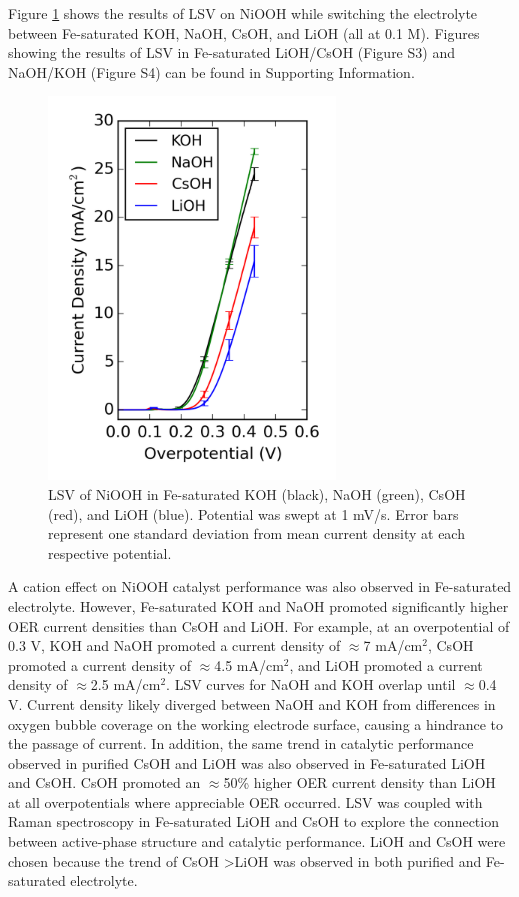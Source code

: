 \documentclass[journal=jpccck,manuscript=article,email=true]{achemso}
\begin{document}
Figure \ref{fig-2} shows the results of LSV on NiOOH while switching the electrolyte between Fe-saturated KOH, NaOH, CsOH, and LiOH (all at 0.1 M). Figures showing the results of LSV in Fe-saturated LiOH/CsOH (Figure S3) and NaOH/KOH (Figure S4) can be found in Supporting Information.

\begin{figure}[h]
\centering
\includegraphics[width=3in]{./images/figures-main/IvsV-Na-K-Li-Cs-iron.png}
\caption{\label{fig-2}LSV of NiOOH in Fe-saturated KOH (black), NaOH (green), CsOH (red), and LiOH (blue). Potential was swept at 1 mV/s. Error bars represent one standard deviation from mean current density at each respective potential.}
\end{figure}

A cation effect on NiOOH catalyst performance was also observed in Fe-saturated electrolyte. However, Fe-saturated KOH and NaOH promoted significantly higher OER current densities than CsOH and LiOH. For example, at an overpotential of 0.3 V, KOH and NaOH promoted a current density of $\approx$7 mA/cm$^{\text{2}}$, CsOH promoted a current density of $\approx$4.5 mA/cm$^{\text{2}}$, and LiOH promoted a current density of $\approx$2.5 mA/cm$^{\text{2}}$. LSV curves for NaOH and KOH overlap until $\approx$0.4 V. Current density likely diverged between NaOH and KOH from differences in oxygen bubble coverage on the working electrode surface, causing a hindrance to the passage of current. In addition, the same trend in catalytic performance observed in purified CsOH and LiOH was also observed in Fe-saturated LiOH and CsOH. CsOH promoted an $\approx$50\% higher OER current density than LiOH at all overpotentials where appreciable OER occurred. LSV was coupled with Raman spectroscopy in Fe-saturated LiOH and CsOH to explore the connection between active-phase structure and catalytic performance. LiOH and CsOH were chosen because the trend of CsOH \textgreater LiOH was observed in both purified and Fe-saturated electrolyte.
\end{document}
